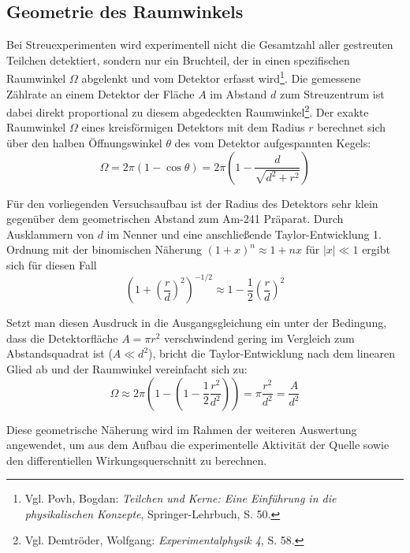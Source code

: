 \subsection{Geometrie des Raumwinkels}
Bei Streuexperimenten wird experimentell nicht die Gesamtzahl aller gestreuten Teilchen detektiert, sondern nur ein Bruchteil, der in einen spezifischen Raumwinkel $\Omega$ abgelenkt und vom Detektor erfasst wird\footnote{Vgl. Povh, Bogdan: \textit{Teilchen und Kerne: Eine Einführung in die physikalischen Konzepte}, Springer-Lehrbuch, S. 50.}. Die gemessene Zählrate an einem Detektor der Fläche $A$ im Abstand $d$ zum Streuzentrum ist dabei direkt proportional zu diesem abgedeckten Raumwinkel\footnote{Vgl. Demtröder, Wolfgang: \textit{Experimentalphysik 4}, S. 58.}.
Der exakte Raumwinkel $\Omega$ eines kreisförmigen Detektors mit dem Radius $r$ berechnet sich über den halben Öffnungswinkel $\theta$ des vom Detektor aufgespannten Kegels:
\begin{equation*}
    \Omega = 2\pi \left( 1 - \cos\theta \right) = 2\pi \left( 1 - \frac{d}{\sqrt{d^2 + r^2}} \right)
\end{equation*}

Für den vorliegenden Versuchsaufbau ist der Radius des Detektors sehr klein gegenüber dem geometrischen Abstand zum Am-241 Präparat. Durch Ausklammern von $d$ im Nenner und eine anschließende Taylor-Entwicklung 1. Ordnung mit der binomischen Näherung $(1+x)^n \approx 1 + nx$ für $|x| \ll 1$ ergibt sich für diesen Fall
\begin{equation*}
    \left( 1 + \left(\frac{r}{d}\right)^2 \right)^{-1/2} \approx 1 - \frac{1}{2}\left(\frac{r}{d}\right)^2
\end{equation*}

Setzt man diesen Ausdruck in die Ausgangsgleichung ein unter der Bedingung, dass die Detektorfläche $A = \pi r^2$ verschwindend gering im Vergleich zum Abstandsquadrat ist ($A \ll d^2$), bricht die Taylor-Entwicklung nach dem linearen Glied ab und der Raumwinkel vereinfacht sich zu:
\begin{equation*}
    \Omega \approx 2\pi \left( 1 - \left( 1 - \frac{1}{2}\frac{r^2}{d^2} \right) \right) = \pi \frac{r^2}{d^2} = \frac{A}{d^2}
\end{equation*}

Diese geometrische Näherung wird im Rahmen der weiteren Auswertung angewendet, um aus dem Aufbau die experimentelle Aktivität der Quelle sowie den differentiellen Wirkungsquerschnitt zu berechnen. 

